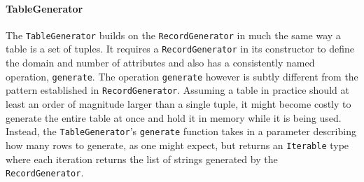 \paragraph{TableGenerator} The \lstinline{TableGenerator} builds on the
\lstinline{RecordGenerator} in much the same way a table is a set of tuples. It
requires a \lstinline{RecordGenerator} in its constructor to define the domain
and number of attributes and also has a consistently named operation,
\lstinline{generate}. The operation \lstinline{generate} however is subtly
different from the pattern established in \lstinline{RecordGenerator}. Assuming
a table in practice should at least an order of magnitude larger than a single
tuple, it might become costly to generate the entire table at once and hold it
in memory while it is being used. Instead, the \lstinline{TableGenerator}'s
\lstinline{generate} function takes in a parameter describing how many rows to
generate, as one might expect, but returns an \lstinline{Iterable} type where
each iteration returns the list of strings generated by the
\lstinline{RecordGenerator}.

